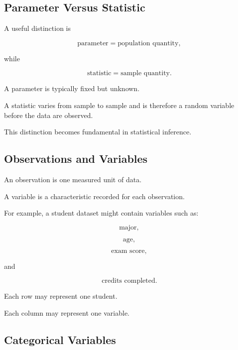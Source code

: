 \subsection{Parameter Versus Statistic}
\label{subsec:parameter-versus-statistic}

A useful distinction is

\[
\boxed{
\text{parameter}
=
\text{population quantity},
}
\]

while

\[
\boxed{
\text{statistic}
=
\text{sample quantity}.
}
\]

A parameter is typically fixed but unknown.

A statistic varies from sample to sample and is therefore a random
variable before the data are observed.

This distinction becomes fundamental in statistical inference.

\subsection{Observations and Variables}
\label{subsec:observations-variables}

An observation is one measured unit of data.

A variable is a characteristic recorded for each observation.

For example, a student dataset might contain variables such as:

\[
\text{major},
\]

\[
\text{age},
\]

\[
\text{exam score},
\]

and

\[
\text{credits completed}.
\]

Each row may represent one student.

Each column may represent one variable.

\subsection{Categorical Variables}
\label{subsec:categorical-variables}

